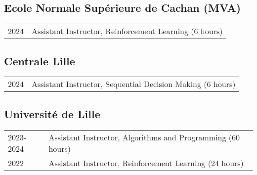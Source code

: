 \subsection*{Ecole Normale Sup\'erieure de Cachan (MVA)}
% 
\begin{longtable}[l]{@{}p{} p{}}

    2024 & Assistant Instructor, Reinforcement Learning (6 hours)\\
    
\end{longtable}

\subsection*{Centrale Lille}
% 
\begin{longtable}[l]{@{}p{} p{}}

    2024 & Assistant Instructor, Sequential Decision Making (6 hours)\\
    
\end{longtable}


\subsection*{Universit\'e de Lille}
% 
\begin{longtable}[l]{@{}p{} p{}}

    2023-2024 & Assistant Instructor, Algorithms and Programming (60 hours)\\
    2022 & Assistant Instructor, Reinforcement Learning (24 hours)\\

\end{longtable}